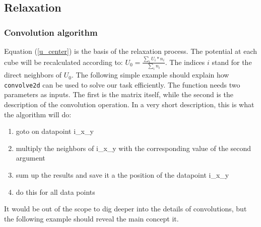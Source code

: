 \documentclass[11pt]{article}
\providecommand{\tightlist}{%
      \setlength{\itemsep}{0pt}\setlength{\parskip}{0pt}}
\begin{document}
    \hypertarget{relaxation}{%
\subsection{Relaxation}\label{relaxation}}

\hypertarget{convolution-algorithm}{%
\subsubsection{Convolution algorithm}\label{convolution-algorithm}}

Equation (\ref{u_center}) is the basis of the relaxation process. The
potential at each cube will be recalculated according to:
\(U_0 = \frac{\sum_{i}{U_i*n_i}}{\sum_{i}{n_i}}\). The indices \(i\)
stand for the direct neighbors of \(U_0\). The following simple example
should explain how \texttt{convolve2d} can be used to solve our task
efficiently. The function needs two parameters as inputs. The first is
the matrix itself, while the second is the description of the
convolution operation. In a very short description, this is what the
algorithm will do:

\begin{enumerate}
\def\labelenumi{\arabic{enumi}.}
\tightlist
\item
  goto on datapoint i\_x\_y
\item
  multiply the neighbors of i\_x\_y with the corresponding value of the
  second argument
\item
  sum up the results and save it a the position of the datapoint i\_x\_y
\item
  do this for all data points
\end{enumerate}

It would be out of the scope to dig deeper into the details of
convolutions, but the following example should reveal the main concept
it.
\end{document}
